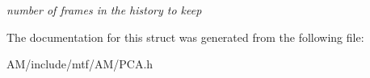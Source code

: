 \begin{DoxyCompactItemize}
\begin{DoxyCompactList}\small\item\em number of frames in the history to keep \end{DoxyCompactList}\end{DoxyCompactItemize}


The documentation for this struct was generated from the following file\-:\begin{DoxyCompactItemize}
\item 
A\-M/include/mtf/\-A\-M/P\-C\-A.\-h\end{DoxyCompactItemize}
